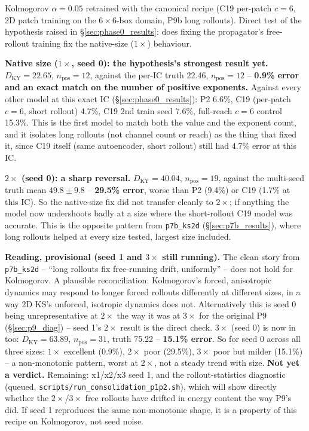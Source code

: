 \documentclass[11pt]{article}
\begin{document}
Kolmogorov $\alpha{=}0.05$ retrained with the canonical recipe (C19
per-patch $c{=}6$, 2D patch training on the $6\times6$-box domain, P9b
long rollouts). Direct test of the hypothesis raised in
\S\ref{sec:phase0_results}: does fixing the propagator's free-rollout
training fix the native-size ($1\times$) behaviour.

\textbf{Native size ($1\times$, seed 0): the hypothesis's strongest
result yet.} $D_{\mathrm{KY}}=22.65$, $n_{\mathrm{pos}}{=}12$, against
the per-IC truth 22.46, $n_{\mathrm{pos}}{=}12$ -- \textbf{0.9\% error
and an exact match on the number of positive exponents.} Against every
other model at this exact IC (\S\ref{sec:phase0_results}): P2 6.6\%,
C19 (per-patch $c{=}6$, short rollout) 4.7\%, C19 2nd train seed 7.6\%,
full-reach $c{=}6$ control 15.3\%. This is the first model to match
both the value and the exponent count, and it isolates long rollouts
(not channel count or reach) as the thing that fixed it, since C19
itself (same autoencoder, short rollout) still had 4.7\% error at this
IC.

\textbf{$2\times$ (seed 0): a sharp reversal.} $D_{\mathrm{KY}}=40.04$,
$n_{\mathrm{pos}}{=}19$, against the multi-seed truth mean $49.8\pm9.8$
-- \textbf{29.5\% error}, worse than P2 (9.4\%) or C19 (1.7\% at this
IC). So the native-size fix did not transfer cleanly to $2\times$; if
anything the model now undershoots badly at a size where the
short-rollout C19 model was accurate. This is the opposite pattern from
\texttt{p7b\_ks2d} (\S\ref{sec:p7b_results}), where long rollouts helped
at every size tested, largest size included.

\textbf{Reading, provisional (seed 1 and $3\times$ still running).} The
clean story from \texttt{p7b\_ks2d} -- ``long rollouts fix free-running
drift, uniformly'' -- does not hold for Kolmogorov. A plausible
reconciliation: Kolmogorov's forced, anisotropic dynamics may respond to
longer forced rollouts differently at different sizes, in a way 2D KS's
unforced, isotropic dynamics does not. Alternatively this is seed 0
being unrepresentative at $2\times$ the way it was at $3\times$ for the
original P9 (\S\ref{sec:p9_diag}) -- seed 1's $2\times$ result is the
direct check. $3\times$ (seed 0) is now in too: $D_{\mathrm{KY}}=63.89$,
$n_{\mathrm{pos}}{=}31$, truth 75.22 -- \textbf{15.1\% error}. So for
seed 0 across all three sizes: $1\times$ excellent (0.9\%), $2\times$
poor (29.5\%), $3\times$ poor but milder (15.1\%) -- a non-monotonic
pattern, worst at $2\times$, not a steady trend with size. \textbf{Not
yet a verdict.} Remaining: x1/x2/x3 seed 1, and the rollout-statistics
diagnostic (queued, \texttt{scripts/run\_consolidation\_p1p2.sh}), which
will show directly whether the $2\times$/$3\times$ free rollouts have
drifted in energy content the way P9's did. If seed 1 reproduces the
same non-monotonic shape, it is a property of this recipe on
Kolmogorov, not seed noise.
\end{document}
